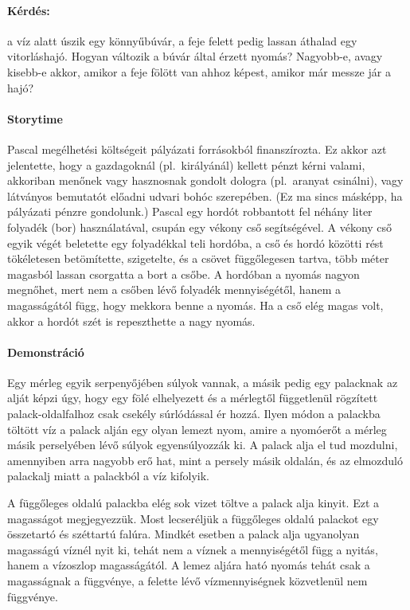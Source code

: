 \documentclass[12pt,a4paper]{scrartcl}
\begin{document}
\paragraph{Kérdés:} a víz alatt úszik egy könnyűbúvár, a feje felett pedig lassan áthalad egy vitorláshajó. Hogyan változik a búvár által érzett nyomás? Nagyobb-e, avagy kisebb-e akkor, amikor a feje fölött van ahhoz képest, amikor már messze jár a hajó?

\paragraph{Storytime} Pascal megélhetési költségeit pályázati forrásokból finanszírozta. Ez akkor azt jelentette, hogy a gazdagoknál (pl.\ királyánál) kellett pénzt kérni valami, akkoriban menőnek vagy hasznosnak gondolt dologra (pl.\ aranyat csinálni), vagy látványos bemutatót előadni udvari bohóc szerepében. (Ez ma sincs másképp, ha pályázati pénzre gondolunk.) Pascal egy hordót robbantott fel néhány liter folyadék (bor) használatával, csupán egy vékony cső segítségével. A vékony cső egyik végét beletette egy folyadékkal teli hordóba, a cső és hordó közötti rést tökéletesen betömítette, szigetelte, és a csövet függőlegesen tartva, több méter magasból lassan csorgatta a bort a csőbe. A hordóban a nyomás nagyon megnőhet, mert nem a csőben lévő folyadék mennyiségétől, hanem a magasságától függ, hogy mekkora benne a nyomás. Ha a cső elég magas volt, akkor a hordót szét is repeszthette a nagy nyomás.

\paragraph{Demonstráció} Egy mérleg egyik serpenyőjében súlyok vannak, a másik pedig egy palacknak az alját képzi úgy, hogy egy fölé elhelyezett és a mérlegtől függetlenül rögzített palack-oldalfalhoz csak csekély súrlódással ér hozzá. Ilyen módon a palackba töltött víz a palack alján egy olyan lemezt nyom, amire a nyomóerőt a mérleg másik perselyében lévő súlyok egyensúlyozzák ki. A palack alja el tud mozdulni, amennyiben arra nagyobb erő hat, mint a persely másik oldalán, és az elmozduló palackalj miatt a palackból a víz kifolyik.

A függőleges oldalú palackba elég sok vizet töltve a palack alja kinyit. Ezt a magasságot megjegyezzük. Most lecseréljük a függőleges oldalú palackot egy összetartó és széttartú falúra. Mindkét esetben a palack alja ugyanolyan magasságú víznél nyit ki, tehát nem a víznek a mennyiségétől függ a nyitás, hanem a vízoszlop magasságától. A lemez aljára ható nyomás tehát csak a magasságnak a függvénye, a felette lévő vízmennyiségnek közvetlenül nem függvénye.
\normalsize
\end{document}

